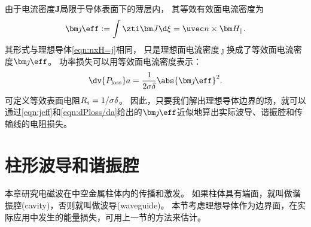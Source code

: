 由于电流密度$\bm J$局限于导体表面下的薄层内，
其等效有效面电流密度为
\begin{equation}
    \label{eqn:jeff}
    \bm\jmath\eff:=\int\zti\bm J\d\xi=\uvec n\times\bm H_\parallel.
\end{equation}
其形式与理想导体\eqref{eqn:nxH=j}相同，
只是理想面电流密度$\bm\jmath$换成了等效面电流密度$\bm\jmath\eff$。
功率损失可以用等效面电流密度表示：
\begin{equation}
    \label{eqn:dPloss/da}
    \dv{P_\text{loss}}a=\frac1{2\sigma\delta}\abs{\bm\jmath\eff}^2.
\end{equation}
可定义等效表面电阻$R_\text s=1/\sigma\delta$。
因此，只要我们解出理想导体边界的场，就可以通过\eqref{eqn:jeff}和\eqref{eqn:dPloss/da}给出的$\bm\jmath\eff$近似地算出实际波导、谐振腔和传输线的电阻损失。

\section{柱形波导和谐振腔}

本章研究电磁波在中空金属柱体内的传播和激发。
如果柱体具有端面，就叫做谐振腔(cavity)，否则就叫做波导(waveguide)。
本节考虑理想导体作为边界面，在实际应用中发生的能量损失，可用上一节的方法来估计。

